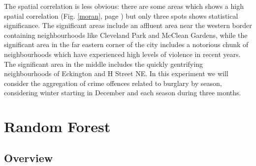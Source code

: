 \documentclass [a4paper,12 pt]{article}
\begin{document}
The spatial correlation is less obvious: there are some areas which shows a high spatial correlation (Fig. \ref{moran}, page \pageref{moran}) but only three spots shows statistical significance. The significant areas include an affluent area near the western border containing neighbourhoods like Cleveland Park and McClean Gardens, while the significant area in the far eastern corner of the city includes a notorious chunk of neighbourhoods which have experienced high levels of violence in recent years. The significant area in the middle includes the quickly gentrifying neighbourhoods of Eckington and H Street NE.
In this experiment we will consider the aggregation of crime offences related to burglary by season, considering winter starting in December and each season during three months. 


\section{Random Forest} \label{RF}
\subsection{Overview}
\end{document}
